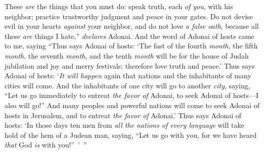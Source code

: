 \begin{biblechapter}
\verse These \textit{are} the things that you must do: speak truth, each \textit{of you}, with his neighbor; practice trustworthy judgment and peace in your gates.
\verse Do not devise evil in your hearts \textit{against} your neighbor, and do not love \textit{a false oath}, because all these \textit{are} things I hate,” \textit{declares} Adonai.
\verse And the word of Adonai of hosts came to me, saying
\verse “Thus says Adonai of hosts: ‘The fast of the fourth \textit{month}, the fifth \textit{month}, the seventh \textit{month}, and the tenth \textit{month} will be for the house of Judah jubilation and joy and merry festivals; therefore love truth and peace.’
\verse Thus says Adonai of hosts: ‘\textit{It will happen} again that nations and the inhabitants of many cities will come.
\verse And the inhabitants of one city will go to another \textit{city}, saying, “Let us go immediately to entreat \textit{the favor of} Adonai, to seek Adonai of hosts—I also will go!”
\verse And many peoples and powerful nations will come to seek Adonai of hosts in Jerusalem, and to entreat \textit{the favor of} Adonai.’
\verse Thus says Adonai of hosts: ‘In those days ten men from \textit{all the nations of every language} will take hold of the hem of a Judean man, saying, “Let us go with you, for we have heard \textit{that} God \textit{is} with you!” ’ ”
\end{biblechapter}

